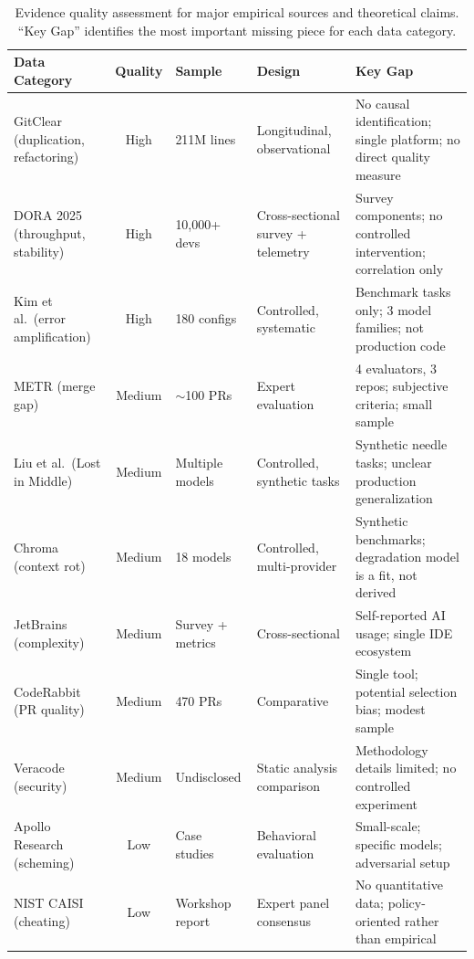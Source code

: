 \documentclass[11pt, a4paper]{googledeepmind}
\begin{document}
\begin{table}[H]
\centering
\caption{Evidence quality assessment for major empirical sources and theoretical claims. ``Key Gap'' identifies the most important missing piece for each data category.}
\label{tab:evidence-quality}
\footnotesize
\begin{tabular}{p{2.4cm}cp{1.5cm}p{2cm}p{4cm}}
\toprule
\textbf{Data Category} & \textbf{Quality} & \textbf{Sample} & \textbf{Design} & \textbf{Key Gap} \\
\midrule
GitClear (duplication, refactoring) & High & 211M lines & Longitudinal, observational & No causal identification; single platform; no direct quality measure \\
\addlinespace
DORA 2025 (throughput, stability) & High & 10,000+ devs & Cross-sectional survey + telemetry & Survey components; no controlled intervention; correlation only \\
\addlinespace
Kim et al.\ (error amplification) & High & 180 configs & Controlled, systematic & Benchmark tasks only; 3 model families; not production code \\
\addlinespace
METR (merge gap) & Medium & $\sim$100 PRs & Expert evaluation & 4 evaluators, 3 repos; subjective criteria; small sample \\
\addlinespace
Liu et al.\ (Lost in Middle) & Medium & Multiple models & Controlled, synthetic tasks & Synthetic needle tasks; unclear production generalization \\
\addlinespace
Chroma (context rot) & Medium & 18 models & Controlled, multi-provider & Synthetic benchmarks; degradation model is a fit, not derived \\
\addlinespace
JetBrains (complexity) & Medium & Survey + metrics & Cross-sectional & Self-reported AI usage; single IDE ecosystem \\
\addlinespace
CodeRabbit (PR quality) & Medium & 470 PRs & Comparative & Single tool; potential selection bias; modest sample \\
\addlinespace
Veracode (security) & Medium & Undisclosed & Static analysis comparison & Methodology details limited; no controlled experiment \\
\addlinespace
Apollo Research (scheming) & Low & Case studies & Behavioral evaluation & Small-scale; specific models; adversarial setup \\
\addlinespace
NIST CAISI (cheating) & Low & Workshop report & Expert panel consensus & No quantitative data; policy-oriented rather than empirical \\

\end{tabular}
\end{table}
\end{document}
